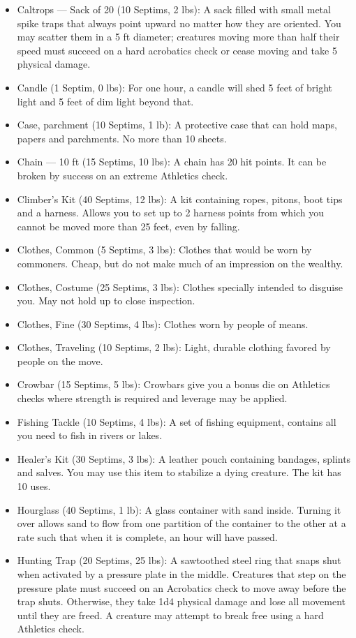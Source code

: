 \documentclass[12pt]{book}
\begin{document}
\begin{itemize}
	\item Caltrops --- Sack of 20 (10 Septims, 2 lbs): A sack filled with small metal spike traps that always point upward no matter how they are oriented. You may scatter them in a 5 ft diameter; creatures moving more than half their speed must succeed on a hard acrobatics check or cease moving and take 5 physical damage.
	\item Candle (1 Septim, 0 lbs): For one hour, a candle will shed 5 feet of bright light and 5 feet of dim light beyond that.
	\item Case, parchment (10 Septims, 1 lb): A protective case that can hold maps, papers and parchments. No more than 10 sheets.
	\item Chain --- 10 ft (15 Septims, 10 lbs): A chain has 20 hit points. It can be broken by success on an extreme Athletics check.
	\item Climber's Kit (40 Septims, 12 lbs): A kit containing ropes, pitons, boot tips and a harness. Allows you to set up to 2 harness points from which you cannot be moved more than 25 feet, even by falling.
	\item Clothes, Common (5 Septims, 3 lbs): Clothes that would be worn by commoners. Cheap, but do not make much of an impression on the wealthy.
	\item Clothes, Costume (25 Septims, 3 lbs): Clothes specially intended to disguise you. May not hold up to close inspection.
	\item Clothes, Fine (30 Septims, 4 lbs): Clothes worn by people of means.
	\item Clothes, Traveling (10 Septims, 2 lbs): Light, durable clothing favored by people on the move.
	\item Crowbar (15 Septims, 5 lbs): Crowbars give you a bonus die on Athletics checks where strength is required and leverage may be applied.
	\item Fishing Tackle (10 Septims, 4 lbs): A set of fishing equipment, contains all you need to fish in rivers or lakes.
	\item Healer's Kit (30 Septims, 3 lbs): A leather pouch containing bandages, splints and salves. You may use this item to stabilize a dying creature. The kit has 10 uses.
	\item Hourglass (40 Septims, 1 lb): A glass container with sand inside. Turning it over allows sand to flow from one partition of the container to the other at a rate such that when it is complete, an hour will have passed.
	\item Hunting Trap (20 Septims, 25 lbs): A sawtoothed steel ring that snaps shut when activated by a pressure plate in the middle. Creatures that step on the pressure plate must succeed on an Acrobatics check to move away before the trap shuts. Otherwise, they take 1d4 physical damage and lose all movement until they are freed. A creature may attempt to break free using a hard Athletics check.

\end{itemize}
\end{document}
